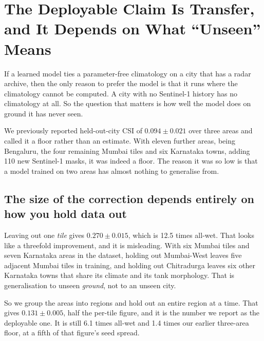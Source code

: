 \section{The Deployable Claim Is Transfer, and It Depends on What ``Unseen'' Means}
\label{sec:transfer}

If a learned model ties a parameter-free climatology on a city that has a radar archive, then the
only reason to prefer the model is that it runs where the climatology cannot be computed. A city
with no Sentinel-1 history has no climatology at all. So the question that matters is how well the
model does on ground it has never seen.

We previously reported held-out-city CSI of $0.094 \pm 0.021$ over three areas and called it a
floor rather than an estimate. With eleven further areas, being Bengaluru, the four remaining
Mumbai tiles and six Karnataka towns, adding 110 new Sentinel-1 masks, it was indeed a floor. The
reason it was so low is that a model trained on two areas has almost nothing to generalise from.

\subsection{The size of the correction depends entirely on how you hold data out}
Leaving out one \emph{tile} gives $0.270 \pm 0.015$, which is 12.5 times all-wet. That looks like a
threefold improvement, and it is misleading. With six Mumbai tiles and seven Karnataka areas in the
dataset, holding out Mumbai-West leaves five adjacent Mumbai tiles in training, and holding out
Chitradurga leaves six other Karnataka towns that share its climate and its tank morphology. That is
generalisation to unseen \emph{ground}, not to an unseen city.

So we group the areas into regions and hold out an entire region at a time. That gives
$0.131 \pm 0.005$, half the per-tile figure, and it is the number we report as the deployable one.
It is still 6.1 times all-wet and 1.4 times our earlier three-area floor, at a fifth of that
figure's seed spread.

